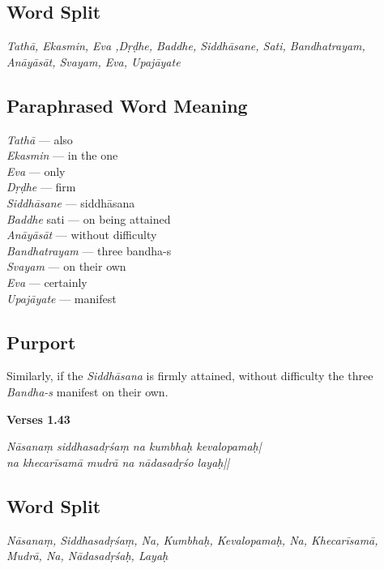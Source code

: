 \subsection*{Word Split}

\textit{Tathā, Ekasmin, Eva ,Dṛḍhe, Baddhe, Siddhāsane, Sati, Bandhatrayam, Anāyāsāt,  Svayam, Eva, Upajāyate}

\subsection*{Paraphrased Word Meaning}

\begin{multicols}{2}
\itemsep=0pt
\textit{Tathā} --- also \\	
\textit{Ekasmin} --- in the one  \\
\textit{Eva} --- only \\
\textit{Dṛḍhe} --- firm \\ 		 
\textit{Siddhāsane} --- siddhāsana	 \\
\textit{Baddhe} sati --- on being attained  \\
\textit{Anāyāsāt} ---  without difficulty  \\
\textit{Bandhatrayam} --- three bandha-s	 \\
\textit{Svayam} --- on their own  \\
\textit{Eva} --- certainly  \\
\textit{Upajāyate} --- manifest 
\end{multicols}

\subsection*{Purport}

Similarly, if the \textit{Siddhāsana} is firmly attained, without difficulty the three \textit{Bandha-s} manifest on their own.   

\noindent \textbf{Verses 1.43}

\begin{shloka}
\textit{Nāsanaṃ siddhasadṛśaṃ na kumbhaḥ kevalopamaḥ|\\
na khecarīsamā mudrā na nādasadṛśo layaḥ||}
\end{shloka}

\subsection*{Word Split}

\textit{Nāsanaṃ, Siddhasadṛśaṃ, Na, Kumbhaḥ, Kevalopamaḥ, Na, Khecarīsamā, Mudrā, Na, Nādasadṛśaḥ, Layaḥ} 

